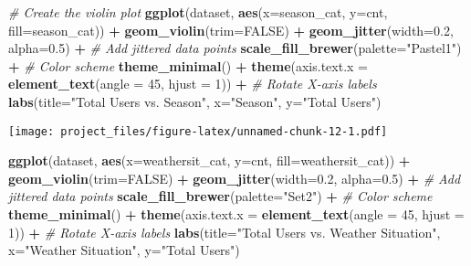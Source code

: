 \documentclass[
]{article}
\newenvironment{Shaded}{\begin{snugshade}}{\end{snugshade}}
\newcommand{\AttributeTok}[1]{\textcolor[rgb]{0.13,0.29,0.53}{#1}}
\newcommand{\CommentTok}[1]{\textcolor[rgb]{0.56,0.35,0.01}{\textit{#1}}}
\newcommand{\ConstantTok}[1]{\textcolor[rgb]{0.56,0.35,0.01}{#1}}
\newcommand{\DecValTok}[1]{\textcolor[rgb]{0.00,0.00,0.81}{#1}}
\newcommand{\FloatTok}[1]{\textcolor[rgb]{0.00,0.00,0.81}{#1}}
\newcommand{\FunctionTok}[1]{\textcolor[rgb]{0.13,0.29,0.53}{\textbf{#1}}}
\newcommand{\NormalTok}[1]{#1}
\newcommand{\SpecialCharTok}[1]{\textcolor[rgb]{0.81,0.36,0.00}{\textbf{#1}}}
\newcommand{\StringTok}[1]{\textcolor[rgb]{0.31,0.60,0.02}{#1}}
\begin{document}
\begin{Shaded}
\begin{Highlighting}[]
\CommentTok{\# Create the violin plot}
\FunctionTok{ggplot}\NormalTok{(dataset, }\FunctionTok{aes}\NormalTok{(}\AttributeTok{x=}\NormalTok{season\_cat, }\AttributeTok{y=}\NormalTok{cnt, }\AttributeTok{fill=}\NormalTok{season\_cat)) }\SpecialCharTok{+} 
  \FunctionTok{geom\_violin}\NormalTok{(}\AttributeTok{trim=}\ConstantTok{FALSE}\NormalTok{) }\SpecialCharTok{+}
  \FunctionTok{geom\_jitter}\NormalTok{(}\AttributeTok{width=}\FloatTok{0.2}\NormalTok{, }\AttributeTok{alpha=}\FloatTok{0.5}\NormalTok{) }\SpecialCharTok{+}  \CommentTok{\# Add jittered data points}
  \FunctionTok{scale\_fill\_brewer}\NormalTok{(}\AttributeTok{palette=}\StringTok{"Pastel1"}\NormalTok{) }\SpecialCharTok{+}  \CommentTok{\# Color scheme}
  \FunctionTok{theme\_minimal}\NormalTok{() }\SpecialCharTok{+} 
  \FunctionTok{theme}\NormalTok{(}\AttributeTok{axis.text.x =} \FunctionTok{element\_text}\NormalTok{(}\AttributeTok{angle =} \DecValTok{45}\NormalTok{, }\AttributeTok{hjust =} \DecValTok{1}\NormalTok{)) }\SpecialCharTok{+}  \CommentTok{\# Rotate X{-}axis labels}
  \FunctionTok{labs}\NormalTok{(}\AttributeTok{title=}\StringTok{"Total Users vs. Season"}\NormalTok{,}
       \AttributeTok{x=}\StringTok{"Season"}\NormalTok{, }\AttributeTok{y=}\StringTok{"Total Users"}\NormalTok{)}
\end{Highlighting}
\end{Shaded}

\texttt{[image: project\_files/figure-latex/unnamed-chunk-12-1.pdf]}

\begin{Shaded}
\begin{Highlighting}[]
\FunctionTok{ggplot}\NormalTok{(dataset, }\FunctionTok{aes}\NormalTok{(}\AttributeTok{x=}\NormalTok{weathersit\_cat, }\AttributeTok{y=}\NormalTok{cnt, }\AttributeTok{fill=}\NormalTok{weathersit\_cat)) }\SpecialCharTok{+} 
  \FunctionTok{geom\_violin}\NormalTok{(}\AttributeTok{trim=}\ConstantTok{FALSE}\NormalTok{) }\SpecialCharTok{+}
  \FunctionTok{geom\_jitter}\NormalTok{(}\AttributeTok{width=}\FloatTok{0.2}\NormalTok{, }\AttributeTok{alpha=}\FloatTok{0.5}\NormalTok{) }\SpecialCharTok{+}  \CommentTok{\# Add jittered data points}
  \FunctionTok{scale\_fill\_brewer}\NormalTok{(}\AttributeTok{palette=}\StringTok{"Set2"}\NormalTok{) }\SpecialCharTok{+}  \CommentTok{\# Color scheme}
  \FunctionTok{theme\_minimal}\NormalTok{() }\SpecialCharTok{+}
  \FunctionTok{theme}\NormalTok{(}\AttributeTok{axis.text.x =} \FunctionTok{element\_text}\NormalTok{(}\AttributeTok{angle =} \DecValTok{45}\NormalTok{, }\AttributeTok{hjust =} \DecValTok{1}\NormalTok{)) }\SpecialCharTok{+}  \CommentTok{\# Rotate X{-}axis labels}
  \FunctionTok{labs}\NormalTok{(}\AttributeTok{title=}\StringTok{"Total Users vs. Weather Situation"}\NormalTok{,}
       \AttributeTok{x=}\StringTok{"Weather Situation"}\NormalTok{, }\AttributeTok{y=}\StringTok{"Total Users"}\NormalTok{)}
\end{Highlighting}
\end{Shaded}
\end{document}
